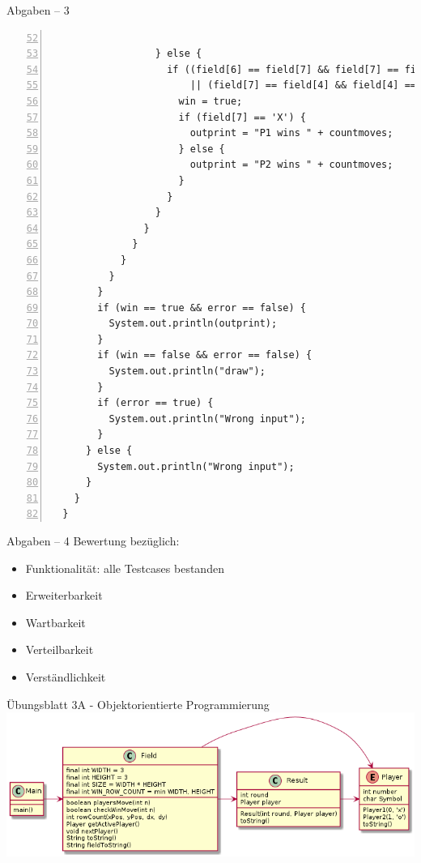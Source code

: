 \documentclass[18pt]{beamer}
\begin{document}
\begin{frame}[fragile]{Abgaben -- 3}
\begin{lstlisting}[basicstyle = \tiny, numbers = left, stepnumber = 5, firstnumber = 52]

                  } else {
                    if ((field[6] == field[7] && field[7] == field[8] && field[7] != '-')
                        || (field[7] == field[4] && field[4] == field[1] && field[7] != '-')) {
                      win = true;
                      if (field[7] == 'X') {
                        outprint = "P1 wins " + countmoves;
                      } else {
                        outprint = "P2 wins " + countmoves;
                      }
                    }
                  }
                }
              }
            }
          }
        }
        if (win == true && error == false) {
          System.out.println(outprint);
        }
        if (win == false && error == false) {
          System.out.println("draw");
        }
        if (error == true) {
          System.out.println("Wrong input");
        }
      } else {
        System.out.println("Wrong input");
      }
    } 
  }
\end{lstlisting}
\end{frame}

\begin{frame}{Abgaben -- 4}
Bewertung bezüglich:
\begin{itemize}
 \item Funktionalität: alle Testcases bestanden
 \item Erweiterbarkeit
 \item Wartbarkeit
 \item Verteilbarkeit
 \item Verständlichkeit
\end{itemize}

 
\end{frame}

\begin{frame}{Übungsblatt 3A - Objektorientierte Programmierung}
 \includegraphics[scale=0.45]{3A}
\end{frame}
\end{document}
